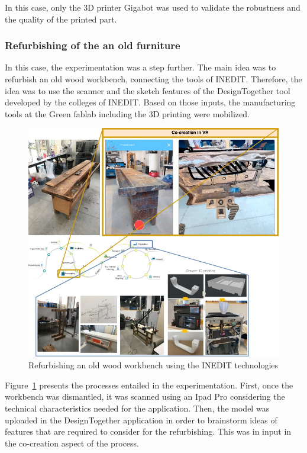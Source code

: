 \documentclass[
  11pt,
]{article}
\begin{document}
In this case, only the 3D printer Gigabot was used to validate the
robustness and the quality of the printed part.

\hypertarget{refurbishing-of-the-an-old-furniture}{%
\subsubsection{Refurbishing of the an old
furniture}\label{refurbishing-of-the-an-old-furniture}}

In this case, the experimentation was a step further. The main idea was
to refurbish an old wood workbench, connecting the tools of INEDIT.
Therefore, the idea was to use the scanner and the sketch features of
the DesignTogether tool developed by the colleges of INEDIT. Based on
those inputs, the manufacturing tools at the Green fablab including the
3D printing were mobilized.

\begin{figure}[H]

{\centering \includegraphics[width=5.20833in,height=\textheight]{figures/Demo-02.jpg}

}

\caption{\label{fig-workbench}Refurbishing an old wood workbench using
the INEDIT technologies}

\end{figure}

Figure~\ref{fig-workbench} presents the processes entailed in the
experimentation. First, once the workbench was dismantled, it was
scanned using an Ipad Pro considering the technical characteristics
needed for the application. Then, the model was uploaded in the
DesignTogether application in order to brainstorm ideas of features that
are required to consider for the refurbishing. This was in input in the
co-creation aspect of the process.
\end{document}
